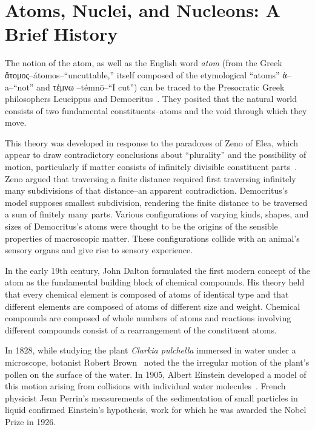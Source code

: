 \section{Atoms, Nuclei, and Nucleons: A Brief History}

The notion of the atom, as well as the English word \textit{atom}
(from the Greek \textgreek{ἄτομος}--átomos--``uncuttable,''
itself composed of the etymological ``atoms''
\textgreek{ἀ}--a--``not''
and
\textgreek{τέμνω }--témnō--``I cut'') can be traced to the Presocratic Greek
philosophers Leucippus and Democritus~\cite{sep-atomism-ancient}.
They posited that the natural world consists of two fundamental
constituents--atoms and the void through which they move.


This theory was developed in response to the paradoxes of Zeno of
Elea, which appear to draw contradictory conclusions about ``plurality'' and
the possibility of motion, particularly if matter consists of infinitely divisible
constituent parts~\cite{sep-paradox-zeno}.
Zeno argued that traversing a finite distance required first traversing
infinitely many subdivisions of that distance--an apparent contradiction.
Democritus's model supposes smallest subdivision, rendering the finite distance
to be traversed a sum of finitely many parts.
Various configurations of varying kinds, shapes, and sizes of Democritus's
atoms were thought to be the origins of the sensible properties of macroscopic
matter.
These configurations collide with an animal's sensory organs and give rise to
sensory experience.


In the early 19th century, John Dalton formulated the first modern concept of
the atom as the fundamental building block of chemical compounds.
His theory held that every chemical element is composed of atoms of identical
type and that different elements are composed of atoms of different size and
weight.
Chemical compounds are composed of whole numbers of atoms and reactions
involving different compounds consist of a rearrangement of the constituent
atoms.


In 1828, while studying the plant \textit{Clarkia pulchella} immersed in water
under a microscope,
botanist Robert Brown~\cite{Brown_1828} noted the
the irregular motion of the plant's pollen on the surface of the water.
In 1905, Albert Einstein developed a model of this motion  arising from
collisions with individual water molecules~\cite{Einstein_1905}.
French physicist Jean Perrin's measurements of the sedimentation of small
particles in liquid confirmed Einstein's hypothesis, work for which he was
awarded the Nobel Prize in 1926.

